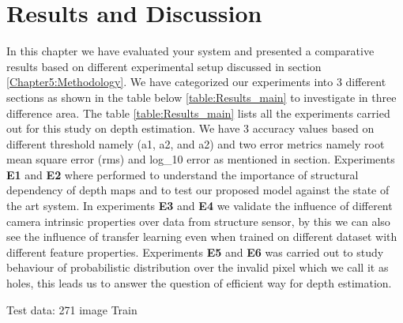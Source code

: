 

\chapter{Results and Discussion}

\label{Chapter6:Results}

 
 
In this chapter we have evaluated your system and presented a comparative results  based on different experimental setup discussed in section \ref{Chapter5:Methodology}. We have categorized our experiments into 3 different sections as shown in the table below \ref{table:Results_main} to investigate in three difference area. The table \ref{table:Results_main} lists all the experiments carried out for this study on depth estimation. We have 3 accuracy values based on different threshold namely (a1, a2, and a2) and two error metrics namely root mean square error (rms) and log\_10 error as mentioned in section. Experiments \textbf{E1} and \textbf{E2} where performed to understand the importance of structural dependency of depth maps and to test our proposed model against the state of the art system. In experiments \textbf{E3} and \textbf{E4} we validate the influence of different camera intrinsic properties over data from structure sensor, by this we can also see the influence of transfer learning even when trained on different dataset with different feature properties. Experiments \textbf{E5} and \textbf{E6} was carried out to study behaviour of probabilistic distribution over the invalid pixel which we call it as holes, this leads us to answer the question of efficient way for depth estimation.
 
 Test data: 271 image
 Train
 
